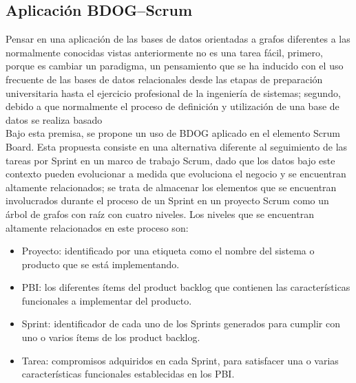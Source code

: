 \documentclass[preprint,12pt]{elsarticle}
\begin{document}
\subsection{\textbf{Aplicación BDOG–Scrum}}
Pensar en una aplicación de las bases de datos orientadas a grafos diferentes a las normalmente conocidas vistas anteriormente no es una tarea fácil, primero, porque es cambiar un paradigma, un pensamiento que se ha inducido con el uso frecuente de las bases de datos relacionales desde las etapas de preparación universitaria hasta el ejercicio profesional de la ingeniería de sistemas; segundo, debido a que normalmente el proceso de definición y utilización de una base de datos se realiza basado\\

Bajo esta premisa, se propone un uso de BDOG aplicado en el elemento Scrum Board. Esta
propuesta consiste en una alternativa diferente al seguimiento de las tareas por Sprint en un marco de trabajo Scrum, dado que los datos bajo este contexto pueden evolucionar a medida que evoluciona el negocio y se encuentran altamente relacionados; se trata de almacenar los elementos que se encuentran involucrados durante el proceso de un Sprint en un proyecto Scrum como un árbol de grafos con raíz con cuatro niveles. Los niveles que se encuentran altamente relacionados en este proceso son:
\begin{itemize}
\item Proyecto: identificado por una etiqueta como
el nombre del sistema o producto que se está
implementando.
\item PBI: los diferentes ítems del product backlog
que contienen las características funcionales a
implementar del producto.
\item Sprint: identificador de cada uno de los Sprints
generados para cumplir con uno o varios ítems de
los product backlog.
\item Tarea: compromisos adquiridos en cada Sprint,
para satisfacer una o varias características
funcionales establecidas en los PBI.
\end{itemize}
\end{document}
